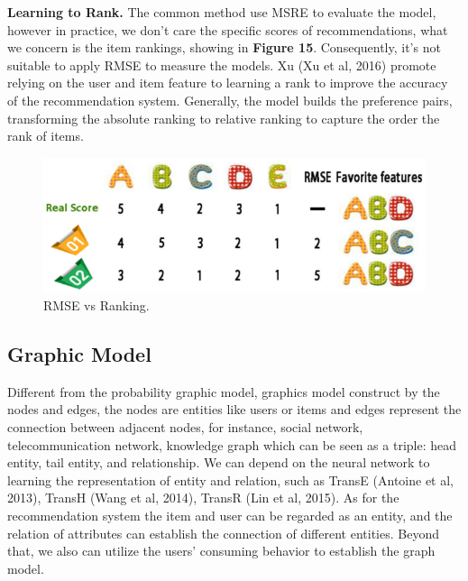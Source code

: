 \documentclass[10pt,twocolumn,letterpaper]{article}
\begin{document}
{\bf Learning to Rank.} The common method use MSRE to evaluate the model, however in practice, we don't care the specific scores of recommendations, what we concern is the item rankings, showing in {\bf Figure 15}. Consequently, it's not suitable to apply RMSE to measure the models. Xu (Xu et al, 2016) promote relying on the user and item feature to learning a rank to improve the accuracy of the recommendation system. Generally, the model builds the preference pairs, transforming the absolute ranking to relative ranking to capture the order the rank of items.
\begin{figure}
	\begin{center}
		\includegraphics[width=0.8\linewidth]{learning_to_rank.png}
	\end{center}
	\caption{RMSE vs Ranking.}
	\label{fig:long}
	\label{fig:onecol}
\end{figure}

\subsection{Graphic Model}
Different from the probability graphic model, graphics model construct by the nodes and edges, the nodes are entities like users or items and edges represent the connection between adjacent nodes, for instance, social network, telecommunication network, knowledge graph which can be seen as a triple: head entity, tail entity, and relationship. We can depend on the neural network to learning the representation of entity and relation, such as TransE (Antoine et al, 2013), TransH (Wang et al, 2014), TransR (Lin et al, 2015). As for the recommendation system the item and user can be regarded as an entity, and the relation of attributes can establish the connection of different entities. Beyond that, we also can utilize the users' consuming behavior to establish the graph model.   
\end{document}
